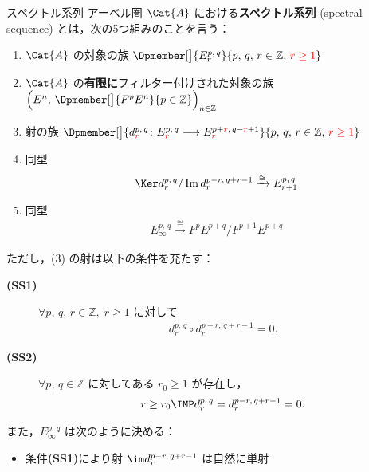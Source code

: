 \documentclass[algtopo_main]{subfiles}
\begin{document}
\begin{mydef}[label=def:SSQ, breakable]{スペクトル系列}
    アーベル圏 $\Cat{A}$ における\textbf{スペクトル系列} (spectral sequence) とは，次の5つ組みのことを言う：
    \begin{enumerate}
        \item $\Cat{A}$ の対象の族 $\Dpmember[\big]{E_r^{p,\, q}}{p,\, q,\, r \in \mathbb{Z},\, \textcolor{red}{r \ge 1}}$
        \item $\Cat{A}$ の\textbf{有限に}\hyperref[def:filtration]{フィルター付けされた対象}の族 $\Bigl(E^n,\, \Dpmember[\big]{F^{p}E^n}{p\in \mathbb{Z}} \Bigr)_{n \in \mathbb{Z}}$
        \item 射の族 $\Dpmember[\big]{d_{\textcolor{red}{r}}^{p,\, q} \colon E^{p,\, q}_{\textcolor{red}{r}} \lto E^{p + \textcolor{red}{r},\, q-\textcolor{red}{r}+1}_{\textcolor{red}{r}}}{p,\, q,\, r \in \mathbb{Z},\, \textcolor{red}{r \ge 1}}$
        \item 同型
        \begin{align}
            \Ker d_r^{p,\, q} / \Im d_r^{p-r,\, q+r-1} \xrightarrow{\cong} E_{r+1}^{p,\, q}
        \end{align}
        \item 同型
        \begin{align}
            E_\infty^{p,\, q} \xrightarrow{\cong} F^p E^{p+q} / F^{p+1} E^{p+q}
        \end{align}
    \end{enumerate}
    ただし，(3) の射は以下の条件を充たす：
    \begin{description}
        \item[\textbf{(SS1)}] $\forall p,\, q,\, r \in \mathbb{Z},\; r \ge 1$ に対して
        \begin{align}
            d_r^{p,\, q} \circ d^{p-r,\, q+r-1}_r = 0.
        \end{align}
        \item[\textbf{(SS2)}] $\forall p,\, q \in \mathbb{Z}$ に対してある $r_0 \ge 1$ が存在し，
        \begin{align}
            r \ge r_0 \IMP d_r^{p,\, q} = d_r^{p-r,\, q+r-1} = 0.
        \end{align}
    \end{description}
    また，$E_\infty^{p,\, q}$ は次のように決める：
    \tcblower
    \begin{itemize}
        \item 
        条件\textbf{(SS1)}により射 $\im d_r^{p-r,\, q+r-1}$ は自然に単射
        \begin{align}

\end{align}
\end{itemize}
\end{mydef}
\end{document}
